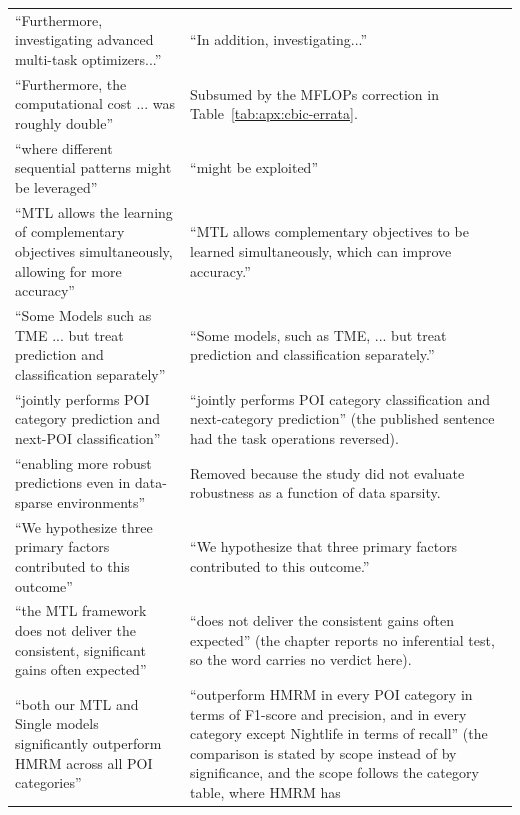 {\begin{longtable}{@{}p{}p{}@{}}
``Furthermore, investigating advanced multi-task optimizers...'' &
``In addition, investigating...'' \\
``Furthermore, the computational cost ... was roughly double'' &
Subsumed by the MFLOPs correction in Table~\ref{tab:apx:cbic-errata}. \\
``where different sequential patterns might be leveraged'' &
``might be exploited'' \\
``MTL allows the learning of complementary objectives simultaneously, allowing for
more accuracy'' &
``MTL allows complementary objectives to be learned simultaneously, which can improve
accuracy.'' \\
``Some Models such as TME ... but treat prediction and classification separately'' &
``Some models, such as TME, ... but treat prediction and classification separately.'' \\
``jointly performs POI category prediction and next-POI classification'' &
``jointly performs POI category classification and next-category prediction'' (the
published sentence had the task operations reversed). \\
``enabling more robust predictions even in data-sparse environments'' &
Removed because the study did not evaluate robustness as a function of data sparsity. \\
``We hypothesize three primary factors contributed to this outcome'' &
``We hypothesize that three primary factors contributed to this outcome.'' \\
\addlinespace
``the MTL framework does not deliver the consistent, significant gains often
expected'' &
``does not deliver the consistent gains often expected'' (the chapter reports no
inferential test, so the word carries no verdict here). \\
``both our MTL and Single models significantly outperform HMRM across all POI
categories'' &
``outperform HMRM in every POI category in terms of F1-score and precision, and in
every category except Nightlife in terms of recall'' (the comparison is stated by scope
instead of by significance, and the scope follows the category table, where HMRM has

\end{longtable}}
